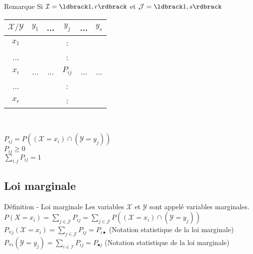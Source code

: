\documentclass[a4paper, 12pt]{article}
\begin{document}
\begin{remarque}{Remarque}
Si $\mathcal{I} = \ldbrack 1, r \rdbrack $ et $\mathcal{J} = \ldbrack 1, s \rdbrack$
{\Large
\begin{center}
\begin{tabular}{|c|ccccc|}
	\hline
	$\mathcal{X/Y}$ & $y_1$ & ...  & $y_j$ & ... & $y_s$ \\
	\hline
	$x_1$ &  &  & : &  & \\
	... &  &  & : &  & \\
	$x_i$ & ... & ... & $P_{ij}$ & ... & ...\\
	... &  &  & : &  & \\
	$x_r$ &  &  & : &  & \\
	\hline
\end{tabular}\\
\end{center}
}
$P_{ij} = P ( (\mathcal{X} = x_i) \cap (\mathcal{Y} = y_j) )$\\
$P_{ij} \geq 0$\\
$\sum_{i, j} P_{ij} = 1$\\
\end{remarque}


\subsection{Loi marginale}
\begin{definition}{Définition - Loi marginale}
Les variables $\mathcal{X}$ et $\mathcal{Y}$ sont appelé variables marginales.\\
$P (X = x_i) = \sum_{j \in \mathcal{J}} P_{ij} = \sum_{j \in \mathcal{J}} P ( (\mathcal{X} = x_i) \cap (\mathcal{Y} = y_j) )$\\
$P_{\forall j} (\mathcal{X} = x_i) = \sum_{j \in \mathcal{J}} P_{ij} = P_{i \bullet}$ (Notation statistique de la loi marginale)\\
$P_{\forall i} (\mathcal{Y} = y_j) = \sum_{i \in \mathcal{I}} P_{ij} = P_{\bullet j}$ (Notation statistique de la loi marginale)\\
\end{definition}
\end{document}
